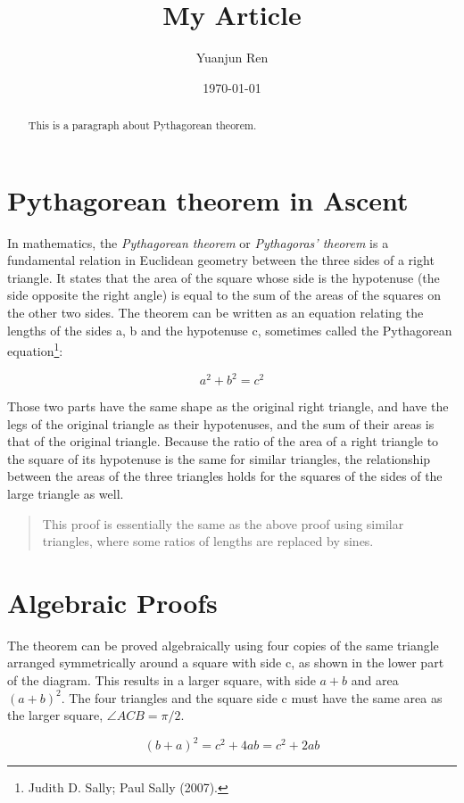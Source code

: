 \documentclass[11pt]{article}
\title{My Article}
\author{Yuanjun Ren}
\date{\today}
\begin{document}
\maketitle

\begin{abstract}
    This is a paragraph about Pythagorean theorem.
\end{abstract}

\newpage

\tableofcontents
\newpage

\section{Pythagorean theorem in Ascent}
In mathematics, the \emph{Pythagorean theorem} or \emph{Pythagoras' theorem} is a fundamental relation in Euclidean geometry between the three sides of a right triangle. It states that the area of the square whose side is the hypotenuse (the side opposite the right angle) is equal to the sum of the areas of the squares on the other two sides. The theorem can be written as an equation relating the lengths of the sides a, b and the hypotenuse c, sometimes called the Pythagorean equation\footnote{Judith D. Sally; Paul Sally (2007).}:

$$
a^2 + b^2 = c^2
$$

Those two parts have the same shape as the original right triangle, and have the legs of the original triangle as their hypotenuses, and the sum of their areas is that of the original triangle. Because the ratio of the area of a right triangle to the square of its hypotenuse is the same for similar triangles, the relationship between the areas of the three triangles holds for the squares of the sides of the large triangle as well.

\begin{quote}
This proof is essentially the same as the above proof using similar triangles, where some ratios of lengths are replaced by sines.
\end{quote}


\section{Algebraic Proofs}
The theorem can be proved algebraically using four copies of the same triangle arranged symmetrically around a square with side c, as shown in the lower part of the diagram. This results in a larger square, with side $a + b$ and area $(a + b)^2$. The four triangles and the square side c must have the same area as the larger square, $\angle ACB = \pi / 2$.

\begin{equation}
(b + a) ^2 = c^2 + 4ab = c^2 + 2ab
\end{equation}


\end{document}
